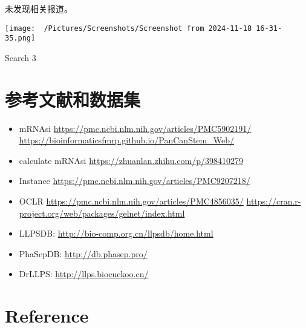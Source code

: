 \documentclass[
]{article}
\begin{document}
未发现相关报道。

\begin{center}\vspace{1.5cm}\end{center}
\def\@captype{figure}
\begin{center}
\texttt{[image: ~/Pictures/Screenshots/Screenshot from 2024-11-18 16-31-35.png]}
\caption{Search 3}\label{fig:search-3}
\end{center}

\begin{center}\vspace{1.5cm}\end{center}

\hypertarget{workflow}{%
\section{参考文献和数据集}\label{workflow}}

\begin{itemize}
\item
  mRNAsi \url{https://pmc.ncbi.nlm.nih.gov/articles/PMC5902191/}
  \url{https://bioinformaticsfmrp.github.io/PanCanStem_Web/}
\item
  calculate mRNAsi \url{https://zhuanlan.zhihu.com/p/398410279}
\item
  Instance \url{https://pmc.ncbi.nlm.nih.gov/articles/PMC9207218/}
\item
  OCLR \url{https://pmc.ncbi.nlm.nih.gov/articles/PMC4856035/}
  \url{https://cran.r-project.org/web/packages/gelnet/index.html}
\item
  LLPSDB: \url{http://bio-comp.org.cn/llpsdb/home.html}
\item
  PhaSepDB: \url{http://db.phasep.pro/}
\item
  DrLLPS: \url{http://llps.biocuckoo.cn/}
\end{itemize}

\hypertarget{bibliography}{%
\section*{Reference}\label{bibliography}}
\end{document}
